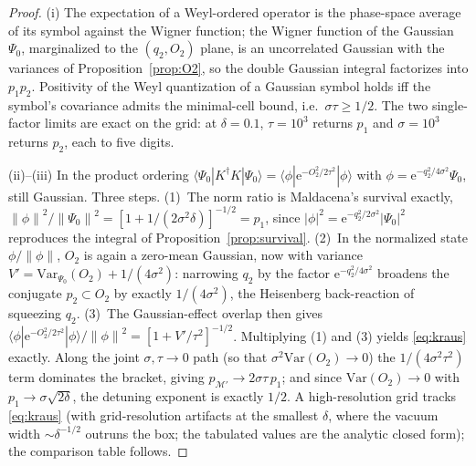 \documentclass[11pt]{article}
\theoremstyle{definition}
\theoremstyle{remark}
\newcommand{\ee}{\mathrm{e}}
\newcommand{\norm}[1]{\left\lVert #1 \right\rVert}
\begin{document}
\begin{proof}
(i) The expectation of a Weyl-ordered operator is the phase-space
average of its symbol against the Wigner function; the Wigner
function of the Gaussian $\Psi_{0}$, marginalized to the
$(q_{2},O_{2})$ plane, is an uncorrelated Gaussian with the variances
of Proposition~\ref{prop:O2}, so the double Gaussian integral
factorizes into $p_{1}p_{2}$. Positivity of the Weyl quantization of
a Gaussian symbol holds iff the symbol's covariance admits the
minimal-cell bound, i.e.\ $\sigma\tau\ge1/2$. The two single-factor
limits are exact on the grid: at $\delta=0.1$,
$\tau=10^{3}$ returns $p_{1}$ and $\sigma=10^{3}$ returns $p_{2}$,
each to five digits.

(ii)--(iii) In the product ordering
$\langle\Psi_{0}|K^{\dagger}K|\Psi_{0}\rangle
=\langle\phi|\ee^{-O_{2}^{2}/2\tau^{2}}|\phi\rangle$ with
$\phi=\ee^{-q_{2}^{2}/4\sigma^{2}}\Psi_{0}$, still Gaussian. Three
steps. (1)~The norm ratio is Maldacena's survival exactly,
$\norm{\phi}^{2}/\norm{\Psi_{0}}^{2}
=[1+1/(2\sigma^{2}\delta)]^{-1/2}=p_{1}$, since
$|\phi|^{2}=\ee^{-q_{2}^{2}/2\sigma^{2}}|\Psi_{0}|^{2}$ reproduces the
integral of Proposition~\ref{prop:survival}. (2)~In the normalized
state $\phi/\norm{\phi}$, $O_{2}$ is again a zero-mean Gaussian, now
with variance
$V'=\mathrm{Var}_{\Psi_{0}}(O_{2})+1/(4\sigma^{2})$: narrowing
$q_{2}$ by the factor $\ee^{-q_{2}^{2}/4\sigma^{2}}$ broadens the
conjugate $p_{2}\subset O_{2}$ by exactly $1/(4\sigma^{2})$, the
Heisenberg back-reaction of squeezing $q_{2}$. (3)~The
Gaussian-effect overlap then gives
$\langle\phi|\ee^{-O_{2}^{2}/2\tau^{2}}|\phi\rangle/\norm{\phi}^{2}
=[1+V'/\tau^{2}]^{-1/2}$. Multiplying (1) and (3) yields
\eqref{eq:kraus} exactly. Along the joint $\sigma,\tau\to0$ path (so
that $\sigma^{2}\mathrm{Var}(O_{2})\to0$) the
$1/(4\sigma^{2}\tau^{2})$ term dominates the bracket, giving
$p_{\mathcal{M}'}\to2\sigma\tau\,p_{1}$; and since $\mathrm{Var}(O_{2})\to0$
with $p_{1}\to\sigma\sqrt{2\delta}$, the detuning exponent is exactly
$1/2$. A high-resolution grid tracks \eqref{eq:kraus} (with
grid-resolution artifacts at the smallest $\delta$, where the vacuum
width $\sim\delta^{-1/2}$ outruns the box; the tabulated values are the
analytic closed form); the comparison table follows.
\end{proof}
\end{document}
